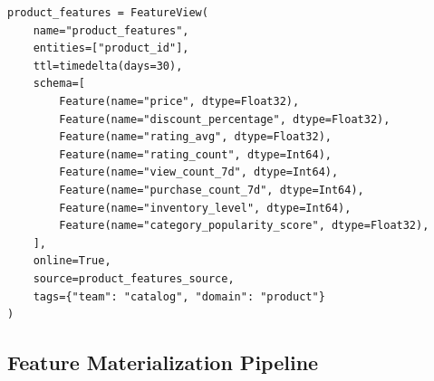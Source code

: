 \begin{lstlisting}[style=python, caption=Complete Feast feature definitions]
product_features = FeatureView(
    name="product_features",
    entities=["product_id"],
    ttl=timedelta(days=30),
    schema=[
        Feature(name="price", dtype=Float32),
        Feature(name="discount_percentage", dtype=Float32),
        Feature(name="rating_avg", dtype=Float32),
        Feature(name="rating_count", dtype=Int64),
        Feature(name="view_count_7d", dtype=Int64),
        Feature(name="purchase_count_7d", dtype=Int64),
        Feature(name="inventory_level", dtype=Int64),
        Feature(name="category_popularity_score", dtype=Float32),
    ],
    online=True,
    source=product_features_source,
    tags={"team": "catalog", "domain": "product"}
)
\end{lstlisting}

\subsection{Feature Materialization Pipeline}

